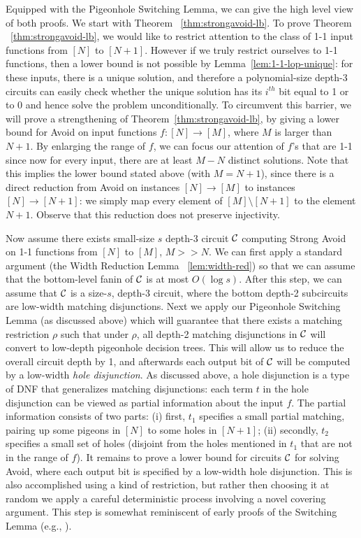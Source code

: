 \documentclass[11pt]{article}
\begin{document}
Equipped with the Pigeonhole Switching Lemma, we can give the high level view of both proofs. 
We start with Theorem ~\ref{thm:strongavoid-lb}.
To prove Theorem ~\ref{thm:strongavoid-lb}, we would like to restrict  attention to the class of 1-1 input functions from $[N]$ to $[N+1]$. However if we truly restrict ourselves to 1-1 functions,
then a lower bound is not possible by Lemma~\ref{lem:1-1-lop-unique}: for these inputs, there is a unique solution, and therefore a polynomial-size depth-3 circuits can easily check whether the unique solution has its $i^{th}$ bit equal to 1 or to 0 and hence solve the problem unconditionally.
To circumvent this barrier, we will prove a strengthening of Theorem~\ref{thm:strongavoid-lb}, by giving a lower bound for Avoid on input functions $f: [N] \rightarrow [M]$, where $M$ is larger than $N+1$. By enlarging the range of $f$, we can focus our attention of $f$'s that are 1-1 since now for every input, there are at least $M-N$ distinct solutions.
Note that this implies the lower bound stated above (with $M=N+1$), since there is a direct reduction from Avoid on instances $[N] \to [M]$ to instances $[N] \to [N+1]$: we simply map every element of $[M] \setminus [N+1]$ to the element $N+1$. Observe that this reduction does not preserve injectivity.

Now assume there exists small-size $s$ depth-3 circuit ${\cal C}$ computing Strong Avoid on 1-1 functions from $[N]$ to $[M]$, $M>>N$. 
We can first apply a standard argument (the Width Reduction Lemma ~\ref{lem:width-red}) so that we can assume that the bottom-level fanin of ${\cal C}$ is at most $O(\log s)$. After this step, we can assume that ${\cal C}$ is a size-$s$, depth-3 circuit, where the bottom depth-2 subcircuits are low-width matching disjunctions. 
Next we apply our Pigeonhole Switching Lemma (as discussed above) which will guarantee that there exists a matching restriction $\rho$ such that under $\rho$, all depth-2 matching disjunctions in ${\cal C}$ will convert to low-depth pigeonhole decision trees. This will allow us to reduce the overall circuit depth by 1, and afterwards each output bit of ${\cal C}$ will be computed by a low-width \emph{hole disjunction}.
As discussed above, a hole disjunction is a type of DNF that generalizes matching disjunctions: each term $t$ in the hole disjunction can be viewed as partial information about the input $f$. The partial information consists of two parts: (i) first, $t_1$ specifies a small partial matching, pairing up some pigeons in $[N]$ to some holes in $[N+1]$; (ii) secondly, $t_2$ specifies a small set of holes (disjoint from the holes mentioned in $t_1$ that are not in the range of $f$).
It remains to prove a lower bound for circuits ${\cal C}$ for solving Avoid, where each output bit is specified by a low-width hole disjunction. This is also accomplished using a kind of restriction, but rather then choosing it at random we apply a careful deterministic process involving a novel covering argument. This step is somewhat reminiscent of early proofs of the Switching Lemma (e.g., \cite{FSS,Ajtai83}).
\end{document}
